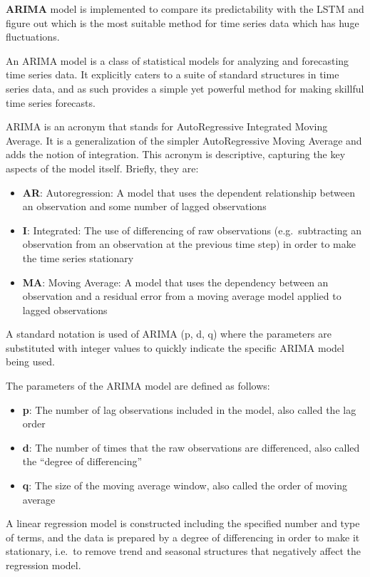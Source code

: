 \documentclass[11pt]{article}
\providecommand{\tightlist}{%
      \setlength{\itemsep}{0pt}\setlength{\parskip}{0pt}}
\begin{document}
    \textbf{ARIMA} model is implemented to compare its predictability with
the LSTM and figure out which is the most suitable method for time
series data which has huge fluctuations.

    An ARIMA model is a class of statistical models for analyzing and
forecasting time series data. It explicitly caters to a suite of
standard structures in time series data, and as such provides a simple
yet powerful method for making skillful time series forecasts.

    ARIMA is an acronym that stands for AutoRegressive Integrated Moving
Average. It is a generalization of the simpler AutoRegressive Moving
Average and adds the notion of integration. This acronym is descriptive,
capturing the key aspects of the model itself. Briefly, they are:

\begin{itemize}
\tightlist
\item
  \textbf{AR}: Autoregression: A model that uses the dependent
  relationship between an observation and some number of lagged
  observations
\item
  \textbf{I}: Integrated: The use of differencing of raw observations
  (e.g.~subtracting an observation from an observation at the previous
  time step) in order to make the time series stationary
\item
  \textbf{MA}: Moving Average: A model that uses the dependency between
  an observation and a residual error from a moving average model
  applied to lagged observations
\end{itemize}

A standard notation is used of ARIMA (p, d, q) where the parameters are
substituted with integer values to quickly indicate the specific ARIMA
model being used.

    The parameters of the ARIMA model are defined as follows:

\begin{itemize}
\tightlist
\item
  \textbf{p}: The number of lag observations included in the model, also
  called the lag order
\item
  \textbf{d}: The number of times that the raw observations are
  differenced, also called the ``degree of differencing''
\item
  \textbf{q}: The size of the moving average window, also called the
  order of moving average
\end{itemize}

    A linear regression model is constructed including the specified number
and type of terms, and the data is prepared by a degree of differencing
in order to make it stationary, i.e.~to remove trend and seasonal
structures that negatively affect the regression model.
\end{document}
